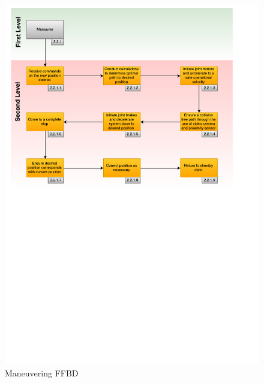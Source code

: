 \begin{figure}[H]
\centering
\includegraphics[width=\textwidth, height=0.94\textheight, keepaspectratio]{Figures/FFBD_maneuver}
\caption{Maneuvering \acrshort{FFBD}}
\label{fig:FFBD_manuever}
\end{figure}



